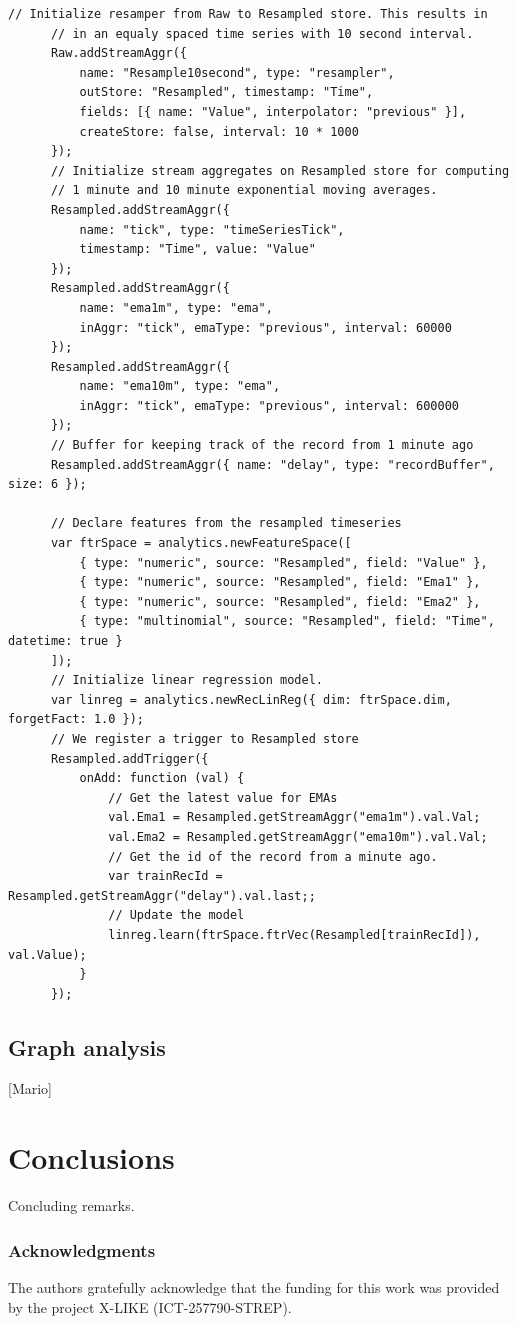\documentclass{article} %
\begin{document}
      \begin{lstlisting}[caption=Time series processing] 	
      // Initialize resamper from Raw to Resampled store. This results in
      // in an equaly spaced time series with 10 second interval.
      Raw.addStreamAggr({
          name: "Resample10second", type: "resampler",
          outStore: "Resampled", timestamp: "Time",
          fields: [{ name: "Value", interpolator: "previous" }],
          createStore: false, interval: 10 * 1000
      });
      // Initialize stream aggregates on Resampled store for computing
      // 1 minute and 10 minute exponential moving averages.
      Resampled.addStreamAggr({
          name: "tick", type: "timeSeriesTick",
          timestamp: "Time", value: "Value"
      });
      Resampled.addStreamAggr({
          name: "ema1m", type: "ema",
          inAggr: "tick", emaType: "previous", interval: 60000
      });
      Resampled.addStreamAggr({
          name: "ema10m", type: "ema",
          inAggr: "tick", emaType: "previous", interval: 600000
      });
      // Buffer for keeping track of the record from 1 minute ago
      Resampled.addStreamAggr({ name: "delay", type: "recordBuffer", size: 6 });

      // Declare features from the resampled timeseries
      var ftrSpace = analytics.newFeatureSpace([
          { type: "numeric", source: "Resampled", field: "Value" },
          { type: "numeric", source: "Resampled", field: "Ema1" },
          { type: "numeric", source: "Resampled", field: "Ema2" },
          { type: "multinomial", source: "Resampled", field: "Time", datetime: true }
      ]);
      // Initialize linear regression model.
      var linreg = analytics.newRecLinReg({ dim: ftrSpace.dim, forgetFact: 1.0 });
      // We register a trigger to Resampled store
      Resampled.addTrigger({
          onAdd: function (val) {
              // Get the latest value for EMAs
              val.Ema1 = Resampled.getStreamAggr("ema1m").val.Val;
              val.Ema2 = Resampled.getStreamAggr("ema10m").val.Val;
              // Get the id of the record from a minute ago.
              var trainRecId = Resampled.getStreamAggr("delay").val.last;;
              // Update the model
              linreg.learn(ftrSpace.ftrVec(Resampled[trainRecId]), val.Value);
          }
      });

      \end{lstlisting}

   \subsection{Graph analysis}
      [Mario] 

\section{Conclusions}
   Concluding remarks.

\subsubsection*{Acknowledgments}
   The authors gratefully acknowledge that the funding for this work was provided by the project X-LIKE (ICT-257790-STREP)\cite{xlike}.




\end{document}
